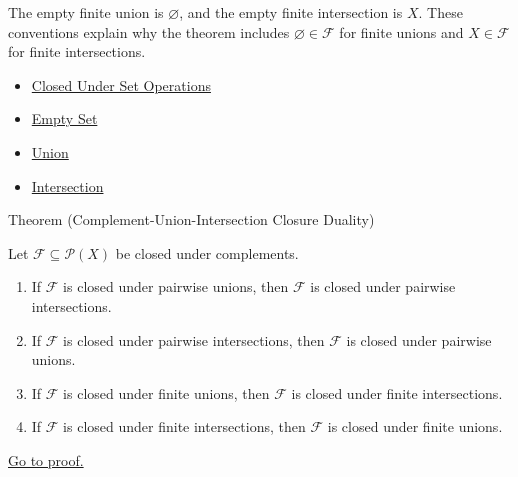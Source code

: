 \begin{remark*}[Exposition]
The empty finite union is \(\varnothing\), and the empty finite intersection is
\(X\).  These conventions explain why the theorem includes
\(\varnothing\in\mathcal F\) for finite unions and \(X\in\mathcal F\) for
finite intersections.
\end{remark*}


\begin{dependencies}
\begin{itemize}
  \item \hyperref[def:closed-under-set-operation-vocabulary]{Closed Under Set Operations}
  \item \hyperref[def:empty-set]{Empty Set}
  \item \hyperref[def:union]{Union}
  \item \hyperref[def:intersection]{Intersection}
\end{itemize}
\end{dependencies}

\begin{theorembox}{Theorem (Complement-Union-Intersection Closure Duality)}
\begin{theorem}\label{thm:complement-union-intersection-closure-duality}
Let \(\mathcal F\subseteq\mathcal P(X)\) be closed under complements.
\begin{enumerate}[label=(\roman*)]
\item If \(\mathcal F\) is closed under pairwise unions, then
      \(\mathcal F\) is closed under pairwise intersections.
\item If \(\mathcal F\) is closed under pairwise intersections, then
      \(\mathcal F\) is closed under pairwise unions.
\item If \(\mathcal F\) is closed under finite unions, then
      \(\mathcal F\) is closed under finite intersections.
\item If \(\mathcal F\) is closed under finite intersections, then
      \(\mathcal F\) is closed under finite unions.
\end{enumerate}
\hyperref[prf:complement-union-intersection-closure-duality]{Go to proof.}
\end{theorem}
\end{theorembox}

